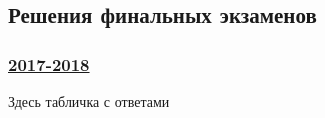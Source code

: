 \subsection*{Решения финальных экзаменов}


\subsubsection*{\hyperref[sec:final_exam_2017_2018]{2017-2018}}
\label{sec:sol_final_exam_2017_2018}

Здесь табличка с ответами
